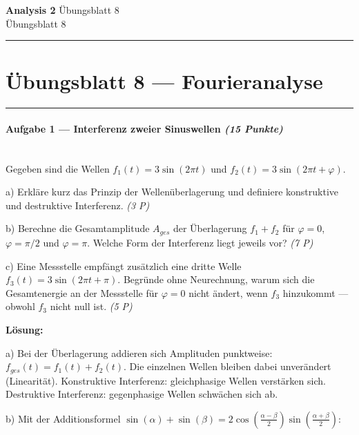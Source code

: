 \documentclass[11pt, a4paper]{article}
\providecommand{\nichttitle}{Übungsblatt}
\providecommand{\nichtsubtitle}{}
\renewcommand{\nichttitle}{Analysis 2}
\renewcommand{\nichtsubtitle}{Übungsblatt 8}
\begin{document}
\begin{center}
{\Large\bfseries\color{accent}\nichttitle}
\ifx\nichtsubtitle\empty\else
  \\[2pt]{\normalsize\color{accent!80!black}\nichtsubtitle}
\fi
\\[2pt]
\color{accent}\rule{0.4\linewidth}{0.8pt}\color{black}
\end{center}
\vspace{4pt}


\section{Übungsblatt 8 — Fourieranalyse}


\noindent\textcolor{rulegray}{\rule{\linewidth}{0.4pt}}


\paragraph{Aufgabe 1 — Interferenz zweier Sinuswellen \textit{(15 Punkte)}}\mbox{}\\[2pt]

Gegeben sind die Wellen $f_1(t) = 3\sin(2\pi t)$ und $f_2(t) = 3\sin(2\pi t + \varphi)$.


a) Erkläre kurz das Prinzip der Wellenüberlagerung und definiere konstruktive und destruktive Interferenz. \textit{(3 P)}


b) Berechne die Gesamtamplitude $A_{ges}$ der Überlagerung $f_1 + f_2$ für $\varphi = 0$, $\varphi = \pi/2$ und $\varphi = \pi$. Welche Form der Interferenz liegt jeweils vor? \textit{(7 P)}


c) Eine Messstelle empfängt zusätzlich eine dritte Welle $f_3(t) = 3\sin(2\pi t + \pi)$. Begründe ohne Neurechnung, warum sich die Gesamtenergie an der Messstelle für $\varphi = 0$ nicht ändert, wenn $f_3$ hinzukommt — obwohl $f_3$ nicht null ist. \textit{(5 P)}


\textbf{Lösung:}


a) Bei der Überlagerung addieren sich Amplituden punktweise: $f_{ges}(t) = f_1(t) + f_2(t)$. Die einzelnen Wellen bleiben dabei unverändert (Linearität). Konstruktive Interferenz: gleichphasige Wellen verstärken sich. Destruktive Interferenz: gegenphasige Wellen schwächen sich ab.


b) Mit der Additionsformel $\sin(\alpha) + \sin(\beta) = 2\cos\!\left(\frac{\alpha-\beta}{2}\right)\sin\!\left(\frac{\alpha+\beta}{2}\right)$:
\end{document}

